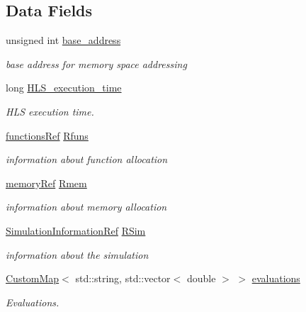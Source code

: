 \subsection*{Data Fields}
\begin{DoxyCompactItemize}
\item 
unsigned int \hyperlink{classHLS__manager_a6dff7a61a281742bbc63efdfb3e10ac8}{base\+\_\+address}
\begin{DoxyCompactList}\small\item\em base address for memory space addressing \end{DoxyCompactList}\item 
long \hyperlink{classHLS__manager_a0f5b6cd7a1597845253492c70ab321f7}{H\+L\+S\+\_\+execution\+\_\+time}
\begin{DoxyCompactList}\small\item\em H\+LS execution time. \end{DoxyCompactList}\item 
\hyperlink{functions_8hpp_add94a569c98f4302fc92c66ad9075a0e}{functions\+Ref} \hyperlink{classHLS__manager_aeb7b92f50edc0b210b0a4b126df3bdee}{Rfuns}
\begin{DoxyCompactList}\small\item\em information about function allocation \end{DoxyCompactList}\item 
\hyperlink{memory_8hpp_aec1333ec6cd561731fb3ed3e55b9caf5}{memory\+Ref} \hyperlink{classHLS__manager_a6c75d253702801f3cc60f35c65b0bf58}{Rmem}
\begin{DoxyCompactList}\small\item\em information about memory allocation \end{DoxyCompactList}\item 
\hyperlink{SimulationInformation_8hpp_a136ebb6fe92363bc51639d8f1422834f}{Simulation\+Information\+Ref} \hyperlink{classHLS__manager_a8daa9fa4877abca7d7fee57333840de6}{R\+Sim}
\begin{DoxyCompactList}\small\item\em information about the simulation \end{DoxyCompactList}\item 
\hyperlink{custom__map_8hpp_a18ca01763abbe3e5623223bfe5aaac6b}{Custom\+Map}$<$ std\+::string, std\+::vector$<$ double $>$ $>$ \hyperlink{classHLS__manager_a43957c7e13f4ed31cdac9636d20bc638}{evaluations}
\begin{DoxyCompactList}\small\item\em Evaluations. \end{DoxyCompactList}\item 

\end{DoxyCompactItemize}

